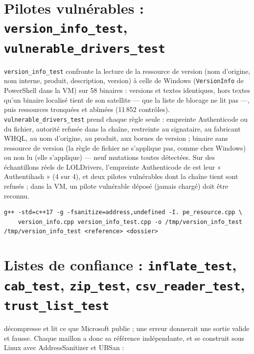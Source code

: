 \documentclass[11pt,a4paper,oneside]{report}
\begin{document}
\section{Pilotes vulnérables : \texttt{version\_info\_test}, \texttt{vulnerable\_drivers\_test}}

\texttt{version\_info\_test} confronte la lecture de la ressource de version
(nom d'origine, nom interne, produit, description, version) à celle de
Windows (\texttt{VersionInfo} de PowerShell dans la VM) sur 58 binaires :
versions et textes identiques, hors textes qu'un binaire localisé tient de son
satellite  — que la liste de blocage ne lit pas —, puis
ressources tronquées et abîmées (11\,852 contrôles).
\texttt{vulnerable\_drivers\_test} prend chaque règle seule : empreinte
Authenticode ou du fichier, autorité refusée dans la chaîne, restreinte au
signataire, au fabricant WHQL, au nom d'origine, au produit, aux bornes de
version ; binaire sans ressource de version (la règle de fichier ne s'applique
pas, comme chez Windows) ou non lu (elle s'applique) — neuf mutations toutes
détectées. Sur des échantillons réels de LOLDrivers, l'empreinte Authenticode
de \wac{} est leur « Authentihash » (4 sur 4), et deux pilotes vulnérables dont
la chaîne tient sont refusés ; dans la VM, un pilote vulnérable déposé (jamais
chargé) doit être reconnu.

\begin{lstlisting}
g++ -std=c++17 -g -fsanitize=address,undefined -I. pe_resource.cpp \
    version_info.cpp version_info_test.cpp -o /tmp/version_info_test
/tmp/version_info_test <reference> <dossier>
\end{lstlisting}

\section{Listes de confiance : \texttt{inflate\_test}, \texttt{cab\_test}, \texttt{zip\_test}, \texttt{csv\_reader\_test}, \texttt{trust\_list\_test}}

 décompresse et lit ce que Microsoft publie ; une erreur
donnerait une sortie valide et fausse. Chaque maillon a donc sa référence
indépendante, et se construit sous Linux avec AddressSanitizer et UBSan :
\end{document}
